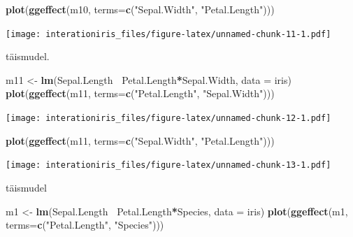 \documentclass[]{book}
\newenvironment{Shaded}{\begin{snugshade}}{\end{snugshade}}
\newcommand{\KeywordTok}[1]{\textcolor[rgb]{0.13,0.29,0.53}{\textbf{#1}}}
\newcommand{\DataTypeTok}[1]{\textcolor[rgb]{0.13,0.29,0.53}{#1}}
\newcommand{\StringTok}[1]{\textcolor[rgb]{0.31,0.60,0.02}{#1}}
\newcommand{\OperatorTok}[1]{\textcolor[rgb]{0.81,0.36,0.00}{\textbf{#1}}}
\newcommand{\NormalTok}[1]{#1}
\begin{document}
\begin{Shaded}
\begin{Highlighting}[]
\KeywordTok{plot}\NormalTok{(}\KeywordTok{ggeffect}\NormalTok{(m10, }\DataTypeTok{terms=}\KeywordTok{c}\NormalTok{(}\StringTok{"Sepal.Width"}\NormalTok{, }\StringTok{"Petal.Length"}\NormalTok{)))}
\end{Highlighting}
\end{Shaded}

\texttt{[image: interationiris\_files/figure-latex/unnamed-chunk-11-1.pdf]}

täismudel.

\begin{Shaded}
\begin{Highlighting}[]
\NormalTok{m11 <-}\StringTok{ }\KeywordTok{lm}\NormalTok{(Sepal.Length}\OperatorTok{~}\StringTok{ }\NormalTok{Petal.Length}\OperatorTok{*}\NormalTok{Sepal.Width, }\DataTypeTok{data =}\NormalTok{ iris)}
\KeywordTok{plot}\NormalTok{(}\KeywordTok{ggeffect}\NormalTok{(m11, }\DataTypeTok{terms=}\KeywordTok{c}\NormalTok{(}\StringTok{"Petal.Length"}\NormalTok{, }\StringTok{"Sepal.Width"}\NormalTok{)))}
\end{Highlighting}
\end{Shaded}

\texttt{[image: interationiris\_files/figure-latex/unnamed-chunk-12-1.pdf]}

\begin{Shaded}
\begin{Highlighting}[]
\KeywordTok{plot}\NormalTok{(}\KeywordTok{ggeffect}\NormalTok{(m11, }\DataTypeTok{terms=}\KeywordTok{c}\NormalTok{(}\StringTok{"Sepal.Width"}\NormalTok{, }\StringTok{"Petal.Length"}\NormalTok{)))}
\end{Highlighting}
\end{Shaded}

\texttt{[image: interationiris\_files/figure-latex/unnamed-chunk-13-1.pdf]}

täismudel

\begin{Shaded}
\begin{Highlighting}[]
\NormalTok{m1 <-}\StringTok{ }\KeywordTok{lm}\NormalTok{(Sepal.Length}\OperatorTok{~}\StringTok{ }\NormalTok{Petal.Length}\OperatorTok{*}\NormalTok{Species, }\DataTypeTok{data =}\NormalTok{ iris)}
\KeywordTok{plot}\NormalTok{(}\KeywordTok{ggeffect}\NormalTok{(m1, }\DataTypeTok{terms=}\KeywordTok{c}\NormalTok{(}\StringTok{"Petal.Length"}\NormalTok{, }\StringTok{"Species"}\NormalTok{)))}
\end{Highlighting}
\end{Shaded}
\end{document}
